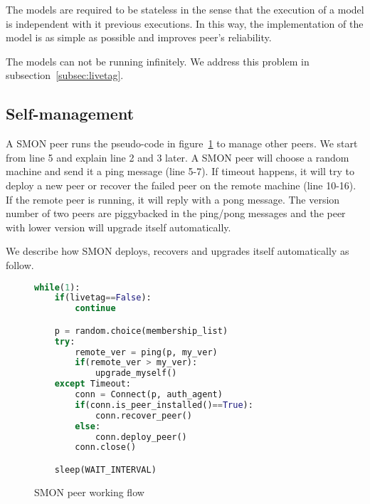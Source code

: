 {The models are required to be stateless in the sense that
the execution of a model is independent with it previous
executions. In this way, the implementation of the model is
as simple as possible and improves peer's reliability.



The models can not be running infinitely. We address this
problem in subsection~\ref{subsec:livetag}.
}

\subsection{Self-management}

A SMON peer runs the pseudo-code in
figure~\ref{fig:peerflow} to manage other peers. We start
from line 5 and explain line 2 and 3 later. A SMON peer will
choose a random machine and send it a ping message (line
5-7). If timeout happens, it will try to deploy a new peer
or recover the failed peer on the remote machine (line
10-16). If the remote peer is running, it will reply with a
pong message. The version number of two peers are
piggybacked in the ping/pong messages and the peer with
lower version will upgrade itself automatically.

We describe how SMON deploys, recovers and upgrades itself
automatically as follow.


\begin{figure}
\centering
\begin{lstlisting}[language=Python,morekeywords={True,False},frame=tb,basicstyle=\small,numbers=right,numbersep=-5pt,numberstyle=\tiny]
while(1):
    if(livetag==False):
        continue

    p = random.choice(membership_list)
    try:
        remote_ver = ping(p, my_ver)
        if(remote_ver > my_ver):
            upgrade_myself()
    except Timeout:
        conn = Connect(p, auth_agent)
        if(conn.is_peer_installed()==True):
            conn.recover_peer()
        else:
            conn.deploy_peer()
        conn.close()

    sleep(WAIT_INTERVAL)
\end{lstlisting}
\caption{SMON peer working flow}
\label{fig:peerflow}
\end{figure}

